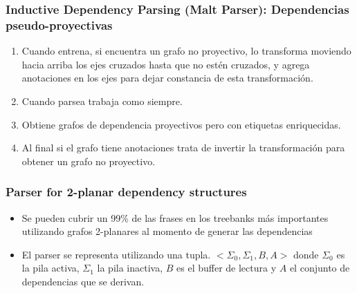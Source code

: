 \documentclass[spanish]{beamer}
\begin{document}
\begin{frame}
\frametitle{Inductive Dependency Parsing (Malt Parser): Dependencias pseudo-proyectivas}
\begin{enumerate}
\item Cuando entrena, si encuentra un grafo no proyectivo, lo transforma moviendo hacia arriba los ejes cruzados hasta que no estén cruzados, y agrega anotaciones en los ejes para dejar constancia de esta transformación.
\item Cuando parsea trabaja como siempre.
\item Obtiene grafos de dependencia proyectivos pero con etiquetas enriquecidas.
\item Al final si el grafo tiene anotaciones trata de invertir la transformación para obtener un grafo no proyectivo.
\end{enumerate}
\end{frame}

\begin{frame}
\frametitle{Parser for 2-planar dependency structures}
\begin{itemize}
\item Se pueden cubrir un 99\% de las frases en los treebanks más importantes utilizando grafos 2-planares al momento de generar las dependencias
\item El parser se representa utilizando una tupla.
$<\Sigma_0,\Sigma_1,B,A>$ donde $\Sigma_0$ es la pila activa, $\Sigma_1$ la pila inactiva, $B$ es el buffer de lectura y $A$ el conjunto de dependencias que se derivan. 
\end{itemize}
\end{frame}
\end{document}
